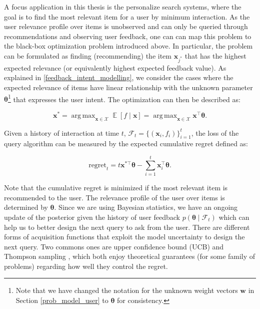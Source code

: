 \documentclass[dissertation,math,vertlayout,pdfa,colorlinks]{aaltoseries}
\newcommand{\bF}{\mathcal{F}}
\DeclareMathOperator{\E}{\mathbb{E}}
\newcommand{\tp}{^{\top}}
\DeclareMathOperator*{\argmax}{arg\,max}
\begin{document}
A focus application in this thesis is the personalize search systems, where the goal is to find the most relevant item for a user by minimum interaction. As the user relevance profile over items is unobserved and can only be queried through recommendations and observing user feedback, one can can map this problem to the black-box optimization problem introduced above. In particular, the problem can be formulated as finding (recommending) the item $\bm{x}_{j^*}$ that has the highest expected relevance (or equivalently highest expected feedback value). As explained in \ref{feedback_intent_modelling}, we consider the cases where the expected relevance of items have linear relationship with the unknown parameter $\bm{\theta}$\footnote{Note that we have changed the notation for the unknown weight vectors $\bm{w}$ in Section \ref{prob_model_user} to $\bm{\theta}$ for consistency.} that expresses the user intent. The optimization can then be described as: 

\begin{equation}\label{Eq:black_box_optimization}
\bm{x}^* = \argmax_{\bm{x} \in \mathcal{X}} \E [f \mid \bm{x}] = \argmax_{\bm{x} \in \mathcal{X}} \bm{x}\tp \bm{\theta}.
\end{equation}

Given a history of interaction at time $t$, $\bF_t = \{(\bm{x}_i , f_i)\}_{i=1}^{t}$, the loss of the query algorithm can be measured by the expected cumulative regret defined as:

\begin{equation}\label{Eq:regret}
\textrm{regret}_t = t \bm{x}^{*\top} \bm{\theta} - \sum_{i=1}^{t} \bm{x}_i\tp \bm{\theta}.
\end{equation} 

Note that the cumulative regret is minimized if the most relevant item is recommended to the user. The relevance profile of the user over items is determined by $\bm{\theta}$. Since we are using Bayesian statistics, we have an ongoing update of the posterior given the history of user feedback $p(\bm{\theta} \mid \bF_t)$ which can help us to better design the next query to ask from the user. %
There are different forms of acquisition functions that exploit the model uncertainty to design the next query. Two commons ones are upper confidence bound (UCB) \cite{auer2002using,Bayes_UCB} and Thompson sampling \cite{agrawal2013thompson}, which both enjoy theoretical guarantees (for some family of problems) regarding how well they control the regret. 
\end{document}
